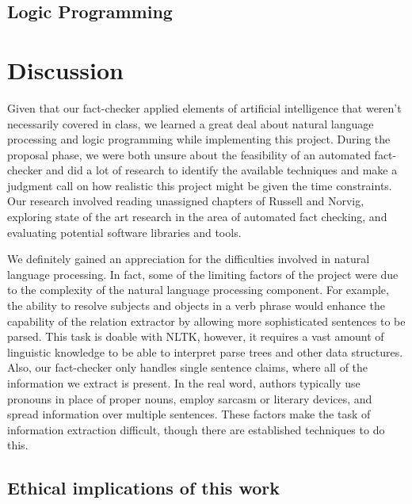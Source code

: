 \documentclass{chi2009}
\begin{document}

\subsection{Logic Programming}

\section{Discussion}

Given that our fact-checker applied elements of artificial intelligence that weren't necessarily covered in class, we learned a great deal about natural language processing and logic programming while implementing this project.  During the proposal phase, we were both unsure about the feasibility of an automated fact-checker and did a lot of research to identify the available techniques and make a judgment call on how realistic this project might be given the time constraints.  Our research involved reading unassigned chapters of Russell and Norvig, exploring state of the art research in the area of automated fact checking, and evaluating potential software libraries and tools.  

We definitely gained an appreciation for the difficulties involved in natural language processing.  In fact, some of the limiting factors of the project were due to the complexity of the natural language processing component.  For example, the ability to resolve subjects and objects in a verb phrase would enhance the capability of the relation extractor by allowing more sophisticated sentences to be parsed.  This task is doable with NLTK, however, it requires a vast amount of linguistic knowledge to be able to interpret parse trees and other data structures.  Also, our fact-checker only handles single sentence claims, where all of the information we extract is present.  In the real word, authors typically use pronouns in place of proper nouns, employ sarcasm or literary devices, and spread information over multiple sentences.  These factors make the task of information extraction difficult, though there are established techniques to do this.

\subsection{Ethical implications of this work}
\end{document}
